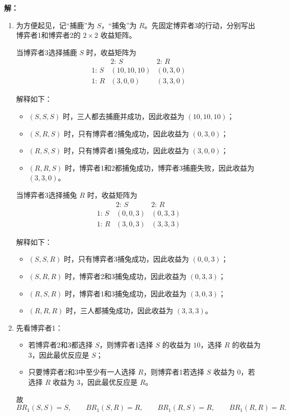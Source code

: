 \documentclass[12pt,a4paper]{article}
\begin{document}
\vspace{0.5cm}
\noindent\textbf{解：}
\begin{enumerate}[label=\alph*.]
  \item
  为方便起见，记“捕鹿”为 \(S\)，“捕兔”为 \(R\)。先固定博弈者3的行动，分别写出博弈者1和博弈者2的 \(2\times 2\) 收益矩阵。

  当博弈者3选择捕鹿 \(S\) 时，收益矩阵为
  \[
  \begin{array}{c|cc}
   & \text{2: }S & \text{2: }R\\
  \hline
  \text{1: }S & (10,10,10) & (0,3,0)\\
  \text{1: }R & (3,0,0) & (3,3,0)
  \end{array}
  \]

  解释如下：
  \begin{itemize}
    \item \((S,S,S)\) 时，三人都去捕鹿并成功，因此收益为 \((10,10,10)\)；
    \item \((S,R,S)\) 时，只有博弈者2捕兔成功，因此收益为 \((0,3,0)\)；
    \item \((R,S,S)\) 时，只有博弈者1捕兔成功，因此收益为 \((3,0,0)\)；
    \item \((R,R,S)\) 时，博弈者1和2都捕兔成功，博弈者3捕鹿失败，因此收益为 \((3,3,0)\)。
  \end{itemize}

  当博弈者3选择捕兔 \(R\) 时，收益矩阵为
  \[
  \begin{array}{c|cc}
   & \text{2: }S & \text{2: }R\\
  \hline
  \text{1: }S & (0,0,3) & (0,3,3)\\
  \text{1: }R & (3,0,3) & (3,3,3)
  \end{array}
  \]

  解释如下：
  \begin{itemize}
    \item \((S,S,R)\) 时，只有博弈者3捕兔成功，因此收益为 \((0,0,3)\)；
    \item \((S,R,R)\) 时，博弈者2和3捕兔成功，因此收益为 \((0,3,3)\)；
    \item \((R,S,R)\) 时，博弈者1和3捕兔成功，因此收益为 \((3,0,3)\)；
    \item \((R,R,R)\) 时，三人都捕兔成功，因此收益为 \((3,3,3)\)。
  \end{itemize}

  \item
  先看博弈者1：
  \begin{itemize}
    \item 若博弈者2和3都选择 \(S\)，则博弈者1选择 \(S\) 的收益为 \(10\)，选择 \(R\) 的收益为 \(3\)，因此最优反应是 \(S\)；
    \item 只要博弈者2和3中至少有一人选择 \(R\)，则博弈者1若选择 \(S\) 收益为 \(0\)，若选择 \(R\) 收益为 \(3\)，因此最优反应是 \(R\)。
  \end{itemize}
  故
  \[
  BR_1(S,S)=S,\qquad BR_1(S,R)=R,\qquad BR_1(R,S)=R,\qquad BR_1(R,R)=R.
  \]


\end{enumerate}
\end{document}
